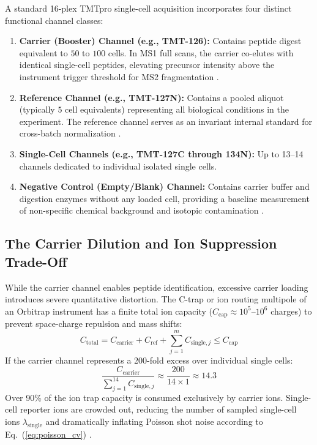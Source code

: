 \documentclass[11pt,twoside,openright]{book}
\begin{document}
A standard 16-plex TMTpro single-cell acquisition incorporates four distinct functional channel classes:
\begin{enumerate}
    \item \textbf{Carrier (Booster) Channel (e.g., TMT-126):} Contains peptide digest equivalent to $50$ to $100$ cells. In MS1 full scans, the carrier co-elutes with identical single-cell peptides, elevating precursor intensity above the instrument trigger threshold for MS2 fragmentation \cite{slavov2021scope2}.
    \item \textbf{Reference Channel (e.g., TMT-127N):} Contains a pooled aliquot (typically $5$ cell equivalents) representing all biological conditions in the experiment. The reference channel serves as an invariant internal standard for cross-batch normalization \cite{petelski2021multiplexed}.
    \item \textbf{Single-Cell Channels (e.g., TMT-127C through 134N):} Up to 13--14 channels dedicated to individual isolated single cells.
    \item \textbf{Negative Control (Empty/Blank) Channel:} Contains carrier buffer and digestion enzymes without any loaded cell, providing a baseline measurement of non-specific chemical background and isotopic contamination \cite{vanderaa2021scp}.
\end{enumerate}

\subsection{The Carrier Dilution and Ion Suppression Trade-Off}

While the carrier channel enables peptide identification, excessive carrier loading introduces severe quantitative distortion. The C-trap or ion routing multipole of an Orbitrap instrument has a finite total ion capacity ($C_{\text{cap}} \approx 10^5$--$10^6$ charges) to prevent space-charge repulsion and mass shifts:
\begin{equation}
C_{\text{total}} = C_{\text{carrier}} + C_{\text{ref}} + \sum_{j=1}^{m} C_{\text{single},j} \le C_{\text{cap}}
\end{equation}
If the carrier channel represents a 200-fold excess over individual single cells:
\begin{equation}
\frac{C_{\text{carrier}}}{\sum_{j=1}^{14} C_{\text{single},j}} \approx \frac{200}{14 \times 1} \approx 14.3
\end{equation}
Over 90\% of the ion trap capacity is consumed exclusively by carrier ions. Single-cell reporter ions are crowded out, reducing the number of sampled single-cell ions $\lambda_{\text{single}}$ and dramatically inflating Poisson shot noise according to Eq.~(\ref{eq:poisson_cv}) \cite{cheung2021carrier, sielaff2023evaluation}.
\end{document}
